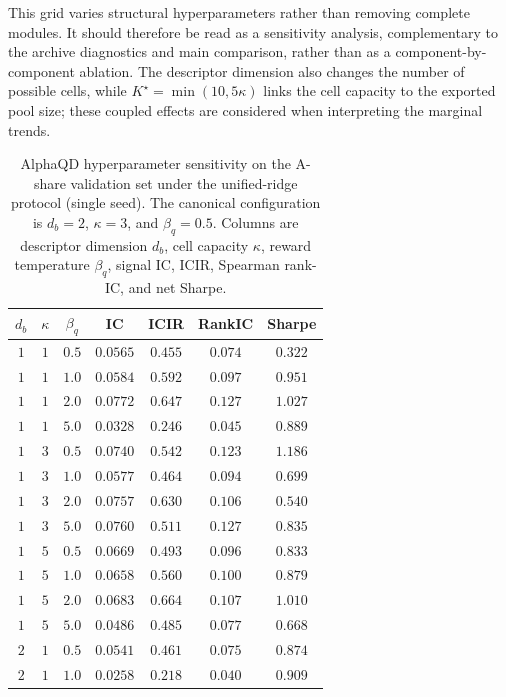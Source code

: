 This grid varies structural hyperparameters rather than removing complete modules. It should therefore be read as a sensitivity analysis, complementary to the archive diagnostics and main comparison, rather than as a component-by-component ablation. The descriptor dimension also changes the number of possible cells, while $K^\star=\min(10,5\kappa)$ links the cell capacity to the exported pool size; these coupled effects are considered when interpreting the marginal trends.

\begin{table}[!htb]
\centering
\caption[AlphaQD hyperparameter sensitivity.]{AlphaQD hyperparameter sensitivity on the A-share validation set under the unified-ridge protocol (single seed). The canonical configuration is $d_b=2$, $\kappa=3$, and $\beta_q=0.5$. Columns are descriptor dimension $d_b$, cell capacity $\kappa$, reward temperature $\beta_q$, signal IC, ICIR, Spearman rank-IC, and net Sharpe.}
\label{tab:alphaqd_ablation_full}
\renewcommand{\arraystretch}{1.05}
\footnotesize
\begin{tabular}{ccccccc}
\toprule
$d_b$ & $\kappa$ & $\beta_q$ & IC & ICIR & RankIC & Sharpe \\
\midrule
$1$ & $1$ & $0.5$ & $0.0565$ & $0.455$ & $0.074$ & $0.322$ \\
$1$ & $1$ & $1.0$ & $0.0584$ & $0.592$ & $0.097$ & $0.951$ \\
$1$ & $1$ & $2.0$ & $0.0772$ & $0.647$ & $0.127$ & $1.027$ \\
$1$ & $1$ & $5.0$ & $0.0328$ & $0.246$ & $0.045$ & $0.889$ \\
$1$ & $3$ & $0.5$ & $0.0740$ & $0.542$ & $0.123$ & $1.186$ \\
$1$ & $3$ & $1.0$ & $0.0577$ & $0.464$ & $0.094$ & $0.699$ \\
$1$ & $3$ & $2.0$ & $0.0757$ & $0.630$ & $0.106$ & $0.540$ \\
$1$ & $3$ & $5.0$ & $0.0760$ & $0.511$ & $0.127$ & $0.835$ \\
$1$ & $5$ & $0.5$ & $0.0669$ & $0.493$ & $0.096$ & $0.833$ \\
$1$ & $5$ & $1.0$ & $0.0658$ & $0.560$ & $0.100$ & $0.879$ \\
$1$ & $5$ & $2.0$ & $0.0683$ & $0.664$ & $0.107$ & $1.010$ \\
$1$ & $5$ & $5.0$ & $0.0486$ & $0.485$ & $0.077$ & $0.668$ \\
\midrule
$2$ & $1$ & $0.5$ & $0.0541$ & $0.461$ & $0.075$ & $0.874$ \\
$2$ & $1$ & $1.0$ & $0.0258$ & $0.218$ & $0.040$ & $0.909$ \\

\end{tabular}
\end{table}
